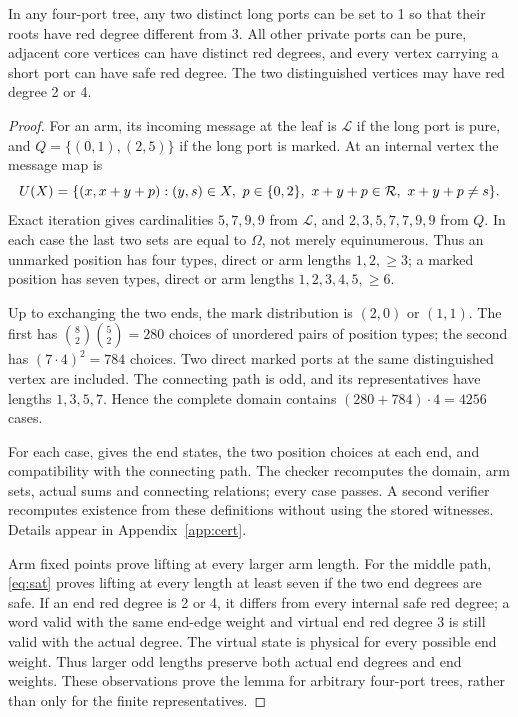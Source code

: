 \begin{lemma}\label{lem:two}
In any four-port tree, any two distinct long ports can be set to 1 so
that their roots have red degree different from 3.  All other private
ports can be pure, adjacent core vertices can have distinct red
degrees, and every vertex carrying a short port can have safe red
degree.  The two distinguished vertices may have red degree 2 or 4.
\end{lemma}
\begin{proof}
For an arm, its incoming message at the leaf is $\mathcal L$ if the
long port is pure, and
$Q=\{(0,1),(2,5)\}$ if the long port is marked.  At an internal
vertex the message map is
\begin{equation}\label{eq:U}
 U(X)=\{(x,x+y+p):(y,s)\in X,\ p\in\{0,2\},\
 x+y+p\in\mathcal R,\ x+y+p\ne s\}.
\end{equation}
Exact iteration gives cardinalities $5,7,9,9$ from $\mathcal L$, and
$2,3,5,7,7,9,9$ from $Q$.  In each case the last two sets are equal
to $\Omega$, not merely equinumerous.  Thus an unmarked position has
four types, direct or arm lengths $1,2,\ge3$; a marked position has
seven types, direct or arm lengths $1,2,3,4,5,\ge6$.

Up to exchanging the two ends, the mark distribution is $(2,0)$ or
$(1,1)$.  The first has
$\binom82\binom52=280$ choices of unordered pairs of position types;
the second has $(7\cdot4)^2=784$ choices.  Two direct marked ports at
the same distinguished vertex are included.  The connecting path is
odd, and its representatives have lengths $1,3,5,7$.  Hence the complete
domain contains $(280+784)\cdot4=4256$ cases.

For each case,  gives the end
states, the two position choices at each end, and compatibility with
the connecting path.  The checker recomputes the domain, arm sets,
actual sums and connecting relations; every case passes.  A second
verifier recomputes existence from these definitions without using the
stored witnesses.  Details appear in Appendix~\ref{app:cert}.

Arm fixed points prove lifting at every larger arm length.  For the
middle path, \eqref{eq:sat} proves lifting at every length at least
seven if the two end degrees are safe.  If an end red degree is 2 or 4,
it differs from every internal safe red degree; a word valid with the
same end-edge weight and virtual end red degree 3 is still valid with
the actual degree.  The virtual state is physical for every possible
end weight.  Thus larger odd lengths preserve both actual end degrees
and end weights.  These observations prove the lemma for arbitrary
four-port trees, rather than only for the finite representatives.
\end{proof}

